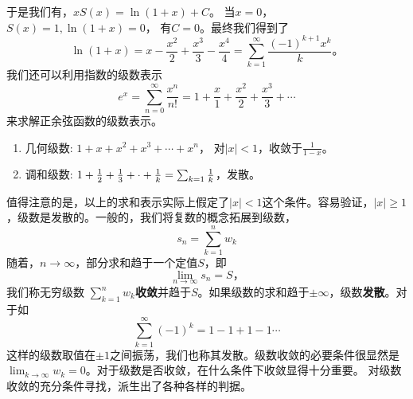 于是我们有，$
    x S(x) = \ln (1 + x) + C \textrm{。}$
当$x=0$， $S(x) = 1, \ln (1+x) = 0$， 有$C=0$。最终我们得到了
\begin{equation}
    \ln (1+x) = x -  \frac{x^2}{2} + \frac{x^3}{3} - \frac{x^4}{4} = \sum_{k=1}^{\infty} \frac{(-1)^{k+1} x^k}{k} \textrm{。}
\end{equation}
我们还可以利用指数的级数表示
\begin{equation}
    e^{x} = \sum_{n=0}^{\infty} \frac{x^n}{n!} = 1 + \frac{x}{1} + \frac{x^2}{2} + \frac{x^3}{3} + \cdots 
\end{equation}
来求解正余弦函数的级数表示。
\begin{enumerate}
    \item 几何级数: $ 1 + x + x^2 + x^3 + \cdots + x^n$， 对$|x|<1$，收敛于$\frac{1}{1-x}$。
    \item 调和级数: $ 1 + \frac{1}{2} + \frac{1}{3} + \cdot +\frac{1}{k} = \sum_{k=1} \frac{1}{k}$，发散。
\end{enumerate}

值得注意的是，以上的求和表示实际上假定了$|x|<1$这个条件。容易验证，$|x|\geq 1$，级数是发散的。一般的，我们将复数的概念拓展到级数，
\begin{equation}
    s_n = \sum_{k=1}^{n} w_{k}
\end{equation}
随着，$n\to \infty$，部分求和趋于一个定值$S$，即
\begin{equation}
    \lim_{n\to \infty} s_n = S \textrm{，}
\end{equation}
我们称无穷级数 $\sum_{k=1}^{n} w_{k}${\bf 收敛}并趋于$S$。如果级数的求和趋于$\pm \infty$，级数{\bf 发散}。对于如
\begin{equation}
    \sum_{k=1}^{\infty} (-1)^k = 1 - 1 + 1 - 1 \cdots 
\end{equation}
这样的级数取值在$\pm 1$之间振荡，我们也称其发散。级数收敛的必要条件很显然是$\lim_{k\to \infty} w_k = 0$。对于级数是否收敛，在什么条件下收敛显得十分重要。
对级数收敛的充分条件寻找，派生出了各种各样的判据。
